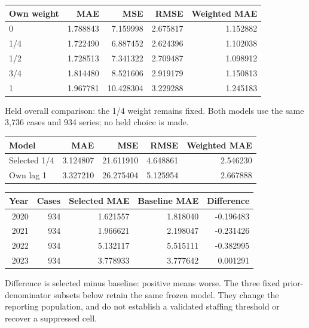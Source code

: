 \documentclass[11pt]{article}
\begin{document}
\begin{center}\small\setlength{\tabcolsep}{4pt}
\begin{tabular}{lrrrr}\toprule
Own weight & MAE & MSE & RMSE & Weighted MAE \\
\midrule
0 & 1.788843 & 7.159998 & 2.675817 & 1.152882 \\
1/4 & 1.722490 & 6.887452 & 2.624396 & 1.102038 \\
1/2 & 1.728513 & 7.341322 & 2.709487 & 1.098912 \\
3/4 & 1.814480 & 8.521606 & 2.919179 & 1.150813 \\
1 & 1.967781 & 10.428304 & 3.229288 & 1.245183 \\
\bottomrule\end{tabular}\end{center}
Held overall comparison: the 1/4 weight remains fixed. Both models use the same 3,736 cases and 934 series; no held choice is made.

\begin{center}\small\setlength{\tabcolsep}{4pt}
\begin{tabular}{lrrrr}\toprule
Model & MAE & MSE & RMSE & Weighted MAE \\
\midrule
Selected 1/4 & 3.124807 & 21.611910 & 4.648861 & 2.546230 \\
Own lag 1 & 3.327210 & 26.275404 & 5.125954 & 2.667888 \\
\bottomrule\end{tabular}\end{center}
\begin{center}\small\setlength{\tabcolsep}{4pt}
\begin{tabular}{rrrrr}\toprule
Year & Cases & Selected MAE & Baseline MAE & Difference \\
\midrule
2020 & 934 & 1.621557 & 1.818040 & -0.196483 \\
2021 & 934 & 1.966621 & 2.198047 & -0.231426 \\
2022 & 934 & 5.132117 & 5.515111 & -0.382995 \\
2023 & 934 & 3.778933 & 3.777642 & 0.001291 \\
\bottomrule\end{tabular}\end{center}
Difference is selected minus baseline: positive means worse. The three fixed prior-denominator subsets below retain the same frozen model. They change the reporting population, and do not establish a validated staffing threshold or recover a suppressed cell.
\end{document}
